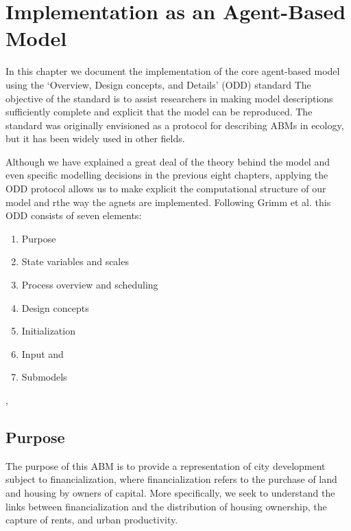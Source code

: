 \chapter{Implementation as an Agent-Based Model} \label{chapter-agent-implementation}

In this chapter we document the implementation of the core agent-based model using the `Overview, Design concepts, and Details' (ODD) standard \cite{grimmODDProtocolReview2010a} The objective of the standard is to assist researchers in making model descriptions sufficiently complete and explicit that the model can be reproduced. The standard was originally envisioned as a protocol for describing ABMs in ecology, but it has been widely used in other fields.

Although we have explained a great deal of the theory behind the model and even specific modelling decisions in the previous eight chapters, applying the ODD protocol allows us to make explicit the computational structure of our model and rthe way the agnets are implemented. Following Grimm et al. \cite{grimmODDProtocolDescribing2020} this ODD consists of seven elements: %

\begin{enumerate}
    \item Purpose
    \item State variables and scales
    \item Process overview and scheduling 
    \item Design concepts
    \item Initialization
    \item Input and 
    \item Submodels 
\end{enumerate}

, %




\section{Purpose}
The purpose of this ABM is to provide a representation of city development subject to financialization, where financialization refers to the purchase of land and housing by owners of capital. More specifically, we seek to understand the links between financialization and the distribution of housing ownership, the capture of rents, and urban productivity. 

